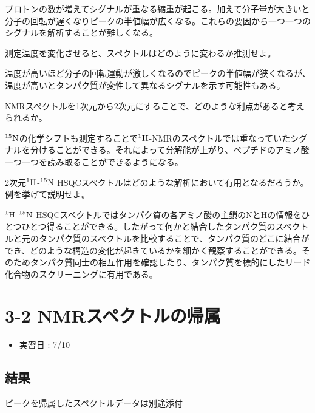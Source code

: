 \documentclass[a4paper,papersize,dvipdfmx]{jsarticle}
\begin{document}
プロトンの数が増えてシグナルが重なる縮重が起こる。加えて分子量が大きいと分子の回転が遅くなりピークの半値幅が広くなる。これらの要因から一つ一つのシグナルを解析することが難しくなる。

\begin{tcolorbox}[colback=white,colbacktitle=black!10!white,coltitle=black,title={8}]
測定温度を変化させると、スペクトルはどのように変わるか推測せよ。
\end{tcolorbox}

温度が高いほど分子の回転運動が激しくなるのでピークの半値幅が狭くなるが、温度が高いとタンパク質が変性して異なるシグナルを示す可能性もある。

\begin{tcolorbox}[colback=white,colbacktitle=black!10!white,coltitle=black,title={9}]
NMRスペクトルを1次元から2次元にすることで、どのような利点があると考えられるか。
\end{tcolorbox}

$\rm ^{15}N$の化学シフトも測定することで$\rm ^1H$-NMRのスペクトルでは重なっていたシグナルを分けることができる。それによって分解能が上がり、ペプチドのアミノ酸一つ一つを読み取ることができるようになる。

\begin{tcolorbox}[colback=white,colbacktitle=black!10!white,coltitle=black,title={10}]
2次元$\rm ^1H$-$\rm ^{15}N$ HSQCスペクトルはどのような解析において有用となるだろうか。例を挙げて説明せよ。
\end{tcolorbox}

$\rm ^1H$-$\rm ^{15}N$ HSQCスペクトルではタンパク質の各アミノ酸の主鎖のNとHの情報をひとつひとつ得ることができる。したがって何かと結合したタンパク質のスペクトルと元のタンパク質のスペクトルを比較することで、タンパク質のどこに結合ができ、どのような構造の変化が起きているかを細かく観察することができる。そのためタンパク質同士の相互作用を確認したり、タンパク質を標的にしたリード化合物のスクリーニングに有用である。

\section*{3-2 NMRスペクトルの帰属}

\begin{itemize}
\item 実習日 : 7/10

\end{itemize}
\subsection*{結果}
ピークを帰属したスペクトルデータは別途添付
\end{document}
